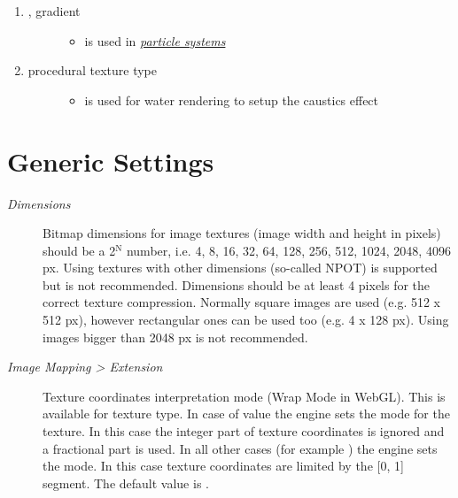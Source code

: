 \documentclass[a4paper,12pt,oneside]{sphinxmanual}
\begin{document}
\begin{enumerate}
\begin{description}
\begin{itemize}
\end{itemize}

\end{description}

\item {} \begin{description}
\item[{, gradient}] \leavevmode\begin{itemize}
\item {} 
is used in {\hyperref[particles:particles-textures]{\emph{particle systems}}}

\end{itemize}

\end{description}

\item {} \begin{description}
\item[{ procedural texture type}] \leavevmode\begin{itemize}
\item {} 
is used for water rendering to setup the caustics effect

\end{itemize}

\end{description}

\end{enumerate}


\section{Generic Settings}
\label{textures:id3}\label{textures:index-2}\begin{description}
\item[{\emph{Dimensions}}] \leavevmode
Bitmap dimensions for image textures (image width and height in pixels) should be a 2$^{\text{N}}$ number, i.e. 4, 8, 16, 32, 64, 128, 256, 512, 1024, 2048, 4096 px. Using textures with other dimensions (so-called NPOT) is supported but is not recommended. Dimensions should be at least 4 pixels for the correct texture compression. Normally square images are used (e.g. 512 x 512 px), however rectangular ones can be used too (e.g. 4 x 128 px). Using images bigger than 2048 px is not recommended.

\item[{\emph{Image Mapping \textgreater{} Extension}}] \leavevmode
Texture coordinates interpretation mode (Wrap Mode in WebGL). This is available for  texture type. In case of  value the engine sets the  mode for the texture. In this case the integer part of texture coordinates is ignored and a fractional part is used. In all other cases (for example ) the engine sets the  mode. In this case texture coordinates are limited by the {[}0, 1{]} segment. The default value is .

\end{description}
\end{document}
